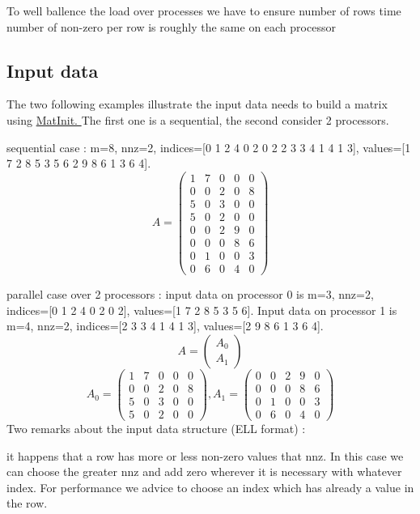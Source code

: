 To well ballence the load over processes we have to ensure number of rows time number of non-\/zero per row is roughly the same on each processor\hypertarget{data_struct_parall_input_example}{}\subsection{Input data}\label{data_struct_parall_input_example}
The two following examples illustrate the input data needs to build a matrix using \hyperlink{mapmat_8c_aaffd7a76c3cf2834df302d1f844aea3e}{Mat\-Init. } The first one is a sequential, the second consider 2 processors.
\begin{DoxyItemize}
\item sequential case \-: m=8, nnz=2, indices=\mbox{[}0 1 2 4 0 2 0 2 2 3 3 4 1 4 1 3\mbox{]}, values=\mbox{[}1 7 2 8 5 3 5 6 2 9 8 6 1 3 6 4\mbox{]}. \[ A = \left( \begin{array}{ccccc}1&7&0&0&0\\0&0&2&0&8\\5&0&3&0&0\\5&0&2&0&0\\0&0&2&9&0\\0&0&0&8&6\\0&1&0&0&3\\0&6&0&4&0\end{array} \right) \]
\item parallel case over 2 processors \-: input data on processor 0 is m=3, nnz=2, indices=\mbox{[}0 1 2 4 0 2 0 2\mbox{]}, values=\mbox{[}1 7 2 8 5 3 5 6\mbox{]}. Input data on processor 1 is m=4, nnz=2, indices=\mbox{[}2 3 3 4 1 4 1 3\mbox{]}, values=\mbox{[}2 9 8 6 1 3 6 4\mbox{]}. \[ A = \left( \begin{array}{c} A_0 \\ A_1 \end{array} \right) \] \[ A_0 = \left( \begin{array}{ccccc} 1&7&0&0&0\\0&0&2&0&8\\5&0&3&0&0\\5&0&2&0&0\end{array} \right) , A_1 = \left( \begin{array}{ccccc} 0&0&2&9&0\\0&0&0&8&6\\0&1&0&0&3\\0&6&0&4&0\end{array} \right) \] Two remarks about the input data structure (E\-L\-L format) \-:
\item it happens that a row has more or less non-\/zero values that nnz. In this case we can choose the greater nnz and add zero wherever it is necessary with whatever index. For performance we advice to choose an index which has already a value in the row.

\end{DoxyItemize}
